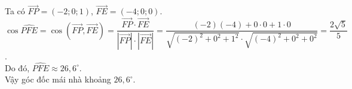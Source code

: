 \begin{ex}
{\begin{itemchoice}
			Ta có $\overrightarrow{FP}=(-2;0;1)$, $\overrightarrow{FE}=(-4;0;0)$.\\ 
			$\cos \widehat{PFE} =\cos \left( \overrightarrow{FP},\overrightarrow{FE} \right) =\dfrac{\overrightarrow{FP} \cdot \overrightarrow{FE}}{\left|\overrightarrow{FP}\right| \cdot \left|\overrightarrow{FE}\right|} =\dfrac{(-2)(-4)+0  \cdot 0+1 \cdot 0}{\sqrt{(-2)^2+0^2+1^2} \cdot \sqrt{(-4)^2+0^2+0^2}} =\dfrac{2\sqrt{5}}{5}$.\\
			Do đó, $\widehat{PFE}  \approx 26{,}6^\circ $. \\
			Vậy  góc đốc mái nhà khoảng $ 26{,}6^\circ $.
		\end{itemchoice}
	} 
\end{ex}



